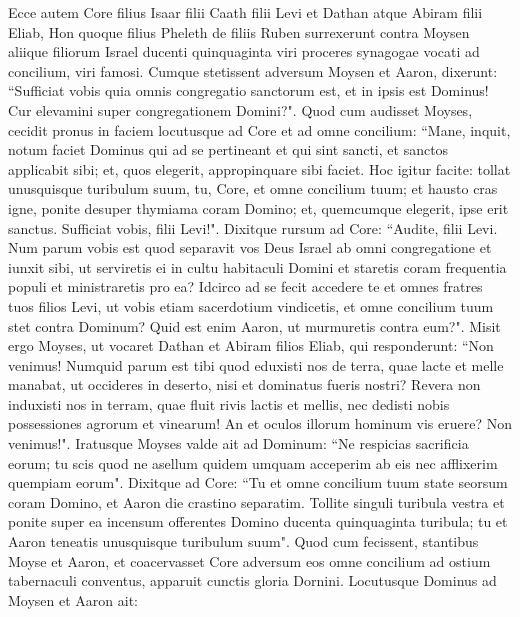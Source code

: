 \begin{biblechapter}  
\verse Ecce autem Core filius Isaar filii Caath filii Levi et Dathan atque Abiram filii Eliab, Hon quoque filius Pheleth de filiis Ruben 
\verse surrexerunt contra Moysen aliique filiorum Israel ducenti quinquaginta viri proceres synagogae vocati ad concilium, viri famosi. 
\verse Cumque stetissent adversum Moysen et Aaron, dixerunt: “Sufficiat vobis quia omnis congregatio sanctorum est, et in ipsis est Dominus! Cur elevamini super congregationem Domini?". 
\verse Quod cum audisset Moyses, cecidit pronus in faciem 
\verse locutusque ad Core et ad omne concilium: “Mane, inquit, notum faciet Dominus qui ad se pertineant et qui sint sancti, et sanctos applicabit sibi; et, quos elegerit, appropinquare sibi faciet. 
\verse Hoc igitur facite: tollat unusquisque turibulum suum, tu, Core, et omne concilium tuum; 
\verse et hausto cras igne, ponite desuper thymiama coram Domino; et, quemcumque elegerit, ipse erit sanctus. Sufficiat vobis, filii Levi!". 
\verse Dixitque rursum ad Core: “Audite, filii Levi. 
\verse Num parum vobis est quod separavit vos Deus Israel ab omni congregatione et iunxit sibi, ut serviretis ei in cultu habitaculi Domini et staretis coram frequentia populi et ministraretis pro ea? 
\verse Idcirco ad se fecit accedere te et omnes fratres tuos filios Levi, ut vobis etiam sacerdotium vindicetis, 
\verse et omne concilium tuum stet contra Dominum? Quid est enim Aaron, ut murmuretis contra eum?". 
\verse Misit ergo Moyses, ut vocaret Dathan et Abiram filios Eliab, qui responderunt: “Non venimus! 
\verse Numquid parum est tibi quod eduxisti nos de terra, quae lacte et melle manabat, ut occideres in deserto, nisi et dominatus fueris nostri? 
\verse Revera non induxisti nos in terram, quae fluit rivis lactis et mellis, nec dedisti nobis possessiones agrorum et vinearum! An et oculos illorum hominum vis eruere? Non venimus!". 
\verse Iratusque Moyses valde ait ad Dominum: “Ne respicias sacrificia eorum; tu scis quod ne asellum quidem umquam acceperim ab eis nec afflixerim quempiam eorum". 
\verse Dixitque ad Core: “Tu et omne concilium tuum state seorsum coram Domino, et Aaron die crastino separatim. 
\verse Tollite singuli turibula vestra et ponite super ea incensum offerentes Domino ducenta quinquaginta turibula; tu et Aaron teneatis unusquisque turibulum suum". 
\verse Quod cum fecissent, stantibus Moyse et Aaron, 
\verse et coacervasset Core adversum eos omne concilium ad ostium tabernaculi conventus, apparuit cunctis gloria Dornini. 
\verse Locutusque Dominus ad Moysen et Aaron ait: 

\end{biblechapter}
